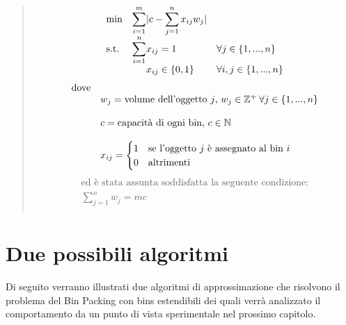 \begin{quote}	
	\begin{equation*}
		\begin{array}{ll@{}ll}
			\text{min}  & \displaystyle\sum\limits_{i=1}^{m} & |c - \displaystyle\sum\limits_{j=1}^{n} x_{ij}w_j|   & \\
			\text{s.t.} & \displaystyle\sum\limits_{i=1}^{n} & x_{ij} = 1 			  								& \forall j \in \{1, ..., n\} \\ 
		                & 								     														& x_{ij} \in \{0,1\}  	  & \forall i, j \in \{1, ..., n\} \\
		\end{array}
	\end{equation*}
	\begin{equation*}
		\begin{array}{ll@{}ll}
	    	\text{dove} &																									   & \\
	    				& w_j = \text{volume dell'oggetto } j	\text{, } w_j \in \mathbb{Z}^+ \: \forall j \in \{1, ..., n\}  & \\ \\
		    			& c = \text{capacità di ogni bin, } c \in \mathbb{N} 												   & \\ \\
						& x_{ij} = 
							\begin{cases}
    							1 & \text{se l'oggetto } j \text{ è assegnato al bin } i \\
    							0 & \text{altrimenti}
							\end{cases}					    																   & \\
		\end{array}
	\end{equation*}
	\begin{equation*}
		\begin{array}{c}
			\text{ed è stata assunta soddisfatta la seguente condizione:} \\
			\displaystyle\sum\limits_{j=1}^{n} w_j = mc					 \\								  
		\end{array}
	\end{equation*}
\end{quote}


\section{Due possibili algoritmi}
Di seguito verranno illustrati due algoritmi di approssimazione che risolvono il problema del Bin Packing con bins estendibili 
dei quali verrà analizzato il comportamento da un punto di vista sperimentale nel prossimo capitolo.

